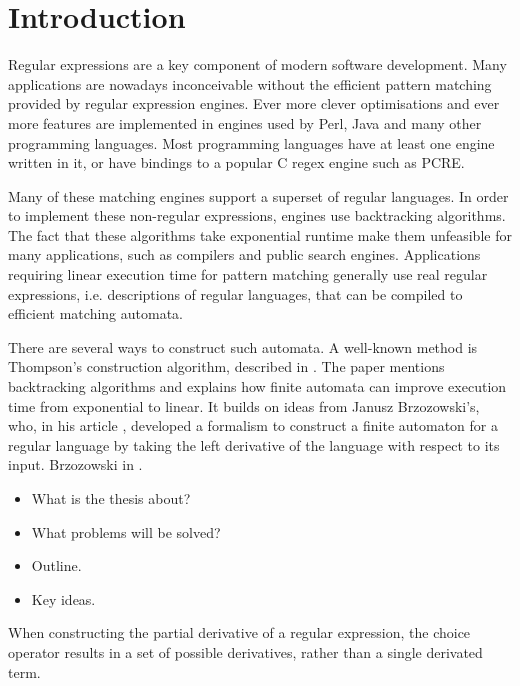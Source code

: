 \chapter{Introduction}

Regular expressions are a key component of modern software development. Many
applications are nowadays inconceivable without the efficient pattern matching
provided by regular expression engines. Ever more clever optimisations and ever
more features are implemented in engines used by Perl, Java and many other
programming languages. Most programming languages have at least one engine
written in it, or have bindings to a popular C regex engine such as PCRE.

Many of these matching engines support a superset of regular languages. In order
to implement these non-regular expressions, engines use backtracking algorithms.
The fact that these algorithms take exponential runtime make them unfeasible for
many applications, such as compilers and public search engines. Applications
requiring linear execution time for pattern matching generally use real regular
expressions, i.e. descriptions of regular languages, that can be compiled to
efficient matching automata.

There are several ways to construct such automata. A well-known method is
Thompson's construction algorithm, described in \cite{thompson}. The paper
mentions backtracking algorithms and explains how finite automata can improve
execution time from exponential to linear. It builds on ideas from Janusz
Brzozowski's, who, in his article \cite{brzozowski}, developed a formalism to
construct a finite automaton for a regular language by taking the left
derivative of the language with respect to its input.  Brzozowski in .

\begin{itemize}
   \item What is the thesis about?
   \item What problems will be solved?
   \item Outline.
   \item Key ideas.
\end{itemize}

When constructing the partial derivative of a regular expression, the choice
operator results in a set of possible derivatives, rather than a single
derivated term.


